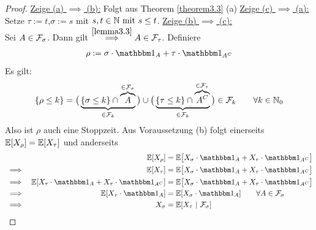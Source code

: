 \begin{proof}
	\underline{Zeige (a) $\implies$ (b):} 
	Folgt aus Theorem \ref{theorem3.3} (a)\nl
	\underline{Zeige (c) $\implies$ (a):}\\
	Setze $\tau:=t$,$\sigma:=s$ mit $s,t\in\mathbb{N}\text{ mit } s\leq t$.\nl
	\underline{Zeige (b) $\implies$ (c):}\\
	Sei $A\in\mathcal{F}_\sigma$. Dann gilt $\stackrel{\ref{lemma3.3}}{\implies} A\in\mathcal{F}_\tau$. Definiere
	\begin{align*}
		\rho:=\sigma\cdot\indi_A+\tau\cdot\indi_{A^C}
	\end{align*}
	Es gilt:
	\begin{align*}
		\lbrace\rho\leq k\rbrace=\big(\underbrace{\lbrace\sigma\leq k\rbrace\cap \overbrace{A}^{\in\mathcal{F}_\sigma}}_{\in\mathcal{F}_k}\big)\cup\big(\underbrace{\lbrace\tau\leq k\rbrace\cap \overbrace{A^C}^{\in\mathcal{F}_\tau}}_{\in\mathcal{F}_k}\big)\in\mathcal{F}_k\qquad\forall k\in\mathbb{N}_0
	\end{align*}
	Also ist $\rho$ auch eine Stoppzeit. Aus Voraussetzung (b) folgt einerseits $\mathbb{E}[X_\rho]=\mathbb{E}[X_\tau]$ und anderseits
	\begin{align*}
		&&\E[X_\rho]
		&=\E\big[X_\sigma\cdot\indi_A+X_\tau\cdot\indi_{A^C}\big]\\
		&\implies&
		\E[X_\tau]
		&=\E\big[X_\sigma\cdot\indi_A+X_\tau\cdot\indi_{A^C}\big]\\
		&\implies&
		\E[X_\tau\cdot \indi_A + X_\tau\cdot \indi_{A^C}]
		&=\E\big[X_\sigma\cdot\indi_A+X_\tau\cdot\indi_{A^C}\big]\\
		&\implies&
		\E[X_\tau\cdot\indi_A]
		&=\E[X_\sigma\cdot\indi_A]\qquad\forall A\in\F_\sigma\\
		&\implies&
		X_\sigma&=\E[X_\tau~|~\F_\sigma]
	\end{align*}
\end{proof}



